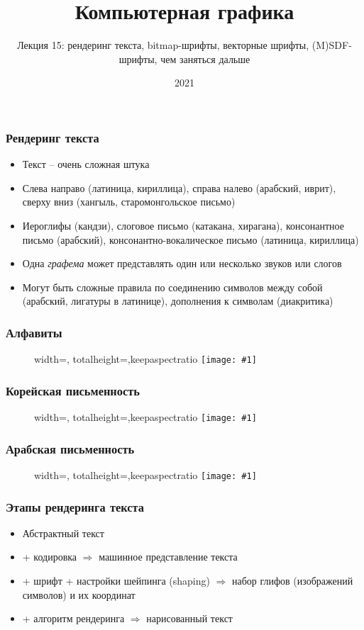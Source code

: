 \documentclass{beamer}
\title{Компьютерная графика}
\subtitle{Лекция 15: рендеринг текста, bitmap-шрифты, векторные шрифты, (M)SDF-шрифты, чем заняться дальше}
\date{2021}
\newcommand{\slideimage}[1]{
  \begin{figure}
    \begin{adjustbox}{width=\textwidth, totalheight=\textheight-2\baselineskip-2\baselineskip,keepaspectratio}
      \texttt{[image: \#1]}
    \end{adjustbox}
  \end{figure}
}
\begin{document}
\frame{\titlepage}

\begin{frame}[fragile]
\frametitle{Рендеринг текста}
\begin{itemize}
\item Текст -- очень сложная штука
\pause
\item Слева направо (латиница, кириллица), справа налево (арабский, иврит), сверху вниз (хангыль, старомонгольское письмо)
\pause
\item Иероглифы (кандзи), слоговое письмо (катакана, хирагана), консонантное письмо (арабский), консонантно-вокалическое письмо (латиница, кириллица)
\pause
\item Одна \textit{графема} может представлять один или несколько звуков или слогов
\pause
\item Могут быть сложные правила по соединению символов между собой (арабский, лигатуры в латинице), дополнения к символам (диакритика)
\end{itemize}
\end{frame}

\begin{frame}[fragile]
\frametitle{Алфавиты}
\slideimage{alphabet.jpg}
\end{frame}

\begin{frame}[fragile]
\frametitle{Корейская письменность}
\slideimage{korean.png}
\end{frame}

\begin{frame}[fragile]
\frametitle{Арабская письменность}
\slideimage{arabic.png}
\end{frame}

\begin{frame}[fragile]
\frametitle{Этапы рендеринга текста}
\begin{itemize}
\item Абстрактный текст
\pause
\item + кодировка \begin{math}\Rightarrow\end{math} машинное представление текста
\pause
\item + шрифт + настройки шейпинга (shaping) \begin{math}\Rightarrow\end{math} набор глифов (изображений символов) и их координат
\pause
\item + алгоритм рендеринга \begin{math}\Rightarrow\end{math} нарисованный текст
\end{itemize}
\end{frame}
\end{document}
